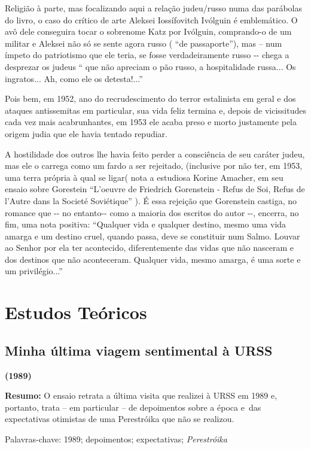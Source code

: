 Religião à parte, mas focalizando aqui a relação judeu/russo numa das
parábolas do livro, o caso do crítico de arte Aleksei Iossífovitch
Ivólguin é emblemático. O avô dele conseguira tocar o sobrenome Katz por
Ivólguin, comprando-o de um militar e Aleksei não só se sente agora
russo ( ``de passaporte''), mas -- num ímpeto do patriotismo que ele
teria, se fosse verdadeiramente russo -\/- chega a desprezar os judeus
`` que não apreciam o pão russo, a hospitalidade russa... Os ingratos...
Ah, como ele os detesta!...''

Pois bem, em 1952, ano do recrudescimento do terror estalinista em geral
e dos ataques antissemitas em particular, sua vida feliz termina e,
depois de vicissitudes cada vez mais acabrunhantes, em 1953 ele acaba
preso e morto justamente pela origem judia que ele havia tentado
repudiar.

A hostilidade dos outros lhe havia feito perder a consciência de seu
caráter judeu, mas ele o carrega como um fardo a ser rejeitado,
(inclusive por não ter, em 1953, uma terra própria à qual se ligar( nota
a estudiosa Korine Amacher, em seu ensaio sobre Gorestein ``L'oeuvre de
Friedrich Gorenstein - Refus de Soi, Refus de l'Autre dans la Societé
Soviétique'' ). É essa rejeição que Gorenstein castiga, no romance que
-\/- no entanto-\/- como a maioria dos escritos do autor -\/-, encerra,
no fim, uma nota positiva: ``Qualquer vida e qualquer destino, mesmo uma
vida amarga e um destino cruel, quando passa, deve se constituir num
Salmo. Louvar ao Senhor por ela ter acontecido, diferentemente das vidas
que não nasceram e dos destinos que não aconteceram. Qualquer vida,
mesmo amarga, é uma sorte e um privilégio...''

\part{Estudos Teóricos}

\chapter{Minha última viagem sentimental à URSS}

\textbf{(1989)}

\textbf{Resumo:} O ensaio retrata a última visita que realizei à URSS em
1989 e, portanto, trata -- em particular -- de depoimentos sobre a época
e~das expectativas otimistas de uma Perestróika que não se realizou.

Palavras-chave: 1989; depoimentos; expectativas; \emph{Perestróika}

